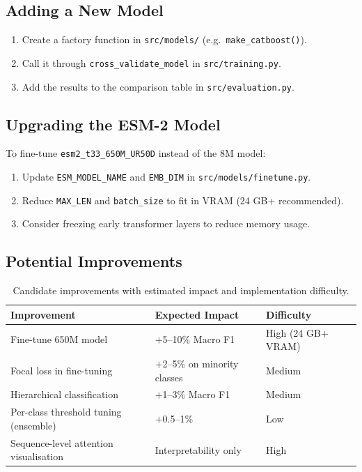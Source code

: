 \documentclass[11pt,a4paper]{article}
\begin{document}
\subsection{Adding a New Model}
\begin{enumerate}
\item Create a factory function in \texttt{src/models/} (e.g.\ \texttt{make\_catboost()}).
\item Call it through \texttt{cross\_validate\_model} in \texttt{src/training.py}.
\item Add the results to the comparison table in \texttt{src/evaluation.py}.
\end{enumerate}

\subsection{Upgrading the ESM-2 Model}
To fine-tune \texttt{esm2\_t33\_650M\_UR50D} instead of the 8M model:
\begin{enumerate}
\item Update \texttt{ESM\_MODEL\_NAME} and \texttt{EMB\_DIM} in \texttt{src/models/finetune.py}.
\item Reduce \texttt{MAX\_LEN} and \texttt{batch\_size} to fit in VRAM (24 GB+ recommended).
\item Consider freezing early transformer layers to reduce memory usage.
\end{enumerate}

\subsection{Potential Improvements}
\begin{table}[H]
\centering
\caption{Candidate improvements with estimated impact and implementation difficulty.}
\begin{tabular}{lll}
\toprule
Improvement & Expected Impact & Difficulty \\
\midrule
Fine-tune 650M model & $+$5--10\% Macro F1 & High (24 GB+ VRAM) \\
Focal loss in fine-tuning & $+$2--5\% on minority classes & Medium \\
Hierarchical classification & $+$1--3\% Macro F1 & Medium \\
Per-class threshold tuning (ensemble) & $+$0.5--1\% & Low \\
Sequence-level attention visualisation & Interpretability only & High \\
\bottomrule
\end{tabular}
\end{table}
\end{document}
